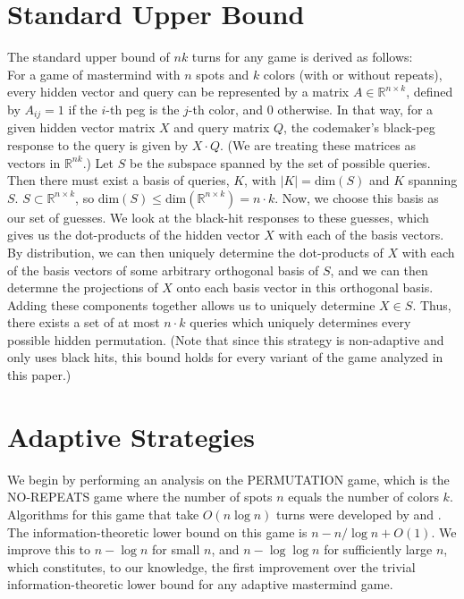 \documentclass[12pt, a4paper]{article}
\begin{document}
\section{Standard Upper Bound}
The standard upper bound of $nk$ turns for any game is derived as follows: \\
For a game of mastermind with $n$ spots and $k$ colors (with or without repeats), every
hidden vector and query can be represented by a matrix $A\in\mathbb{R}^{n\times k}$,
defined by $A_{ij}=1$ if the $i$-th peg is the $j$-th color, and 0 otherwise.
In that way, for a given hidden vector matrix $X$ and query matrix $Q$,
the codemaker's black-peg response to the query is given by $X\cdot Q$.
(We are treating these matrices as vectors in $\mathbb R^{nk}$.)
Let $S$ be the subspace spanned by the set of possible queries. 
Then there must exist a basis of queries,
$K$, with $|K|=\text{dim}(S)$ and $K$ spanning $S$. $S\subset \mathbb{R}^{n\times k}$,
so $\text{dim}(S)\le \text{dim}(\mathbb{R}^{n\times k})=n\cdot k$.
Now, we choose this basis as our set of guesses. We look at the black-hit responses to 
these guesses, which gives us the dot-products of the hidden vector $X$ with each of
the basis vectors. By distribution, we can then uniquely determine the dot-products of 
$X$ with each of the basis vectors of some arbitrary orthogonal basis of $S$, and we can
then determne the projections of $X$ onto each basis vector in this orthogonal basis.
Adding these components together allows us to uniquely determine $X \in S$. 
Thus, there exists a set of at most $n\cdot k$ queries which uniquely determines every
possible hidden permutation. (Note that since this strategy is non-adaptive and only
uses black hits, this bound holds for every variant of the game analyzed in this paper.)
\section{Adaptive Strategies}
We begin by performing an analysis on the PERMUTATION game, which is the NO-REPEATS
game where the number of spots $n$ equals the number of colors $k$. Algorithms for this game
that take $O(n \log n)$ turns were developed by \cite{KT86} and \cite{OS13}. The
information-theoretic lower bound on this game is $n - n/ \log n + O(1)$. We improve this to 
$n - \log n$ for small $n$, and $n- \log \log n$ for sufficiently large $n$, which constitutes, 
to our knowledge, the first improvement over the trivial information-theoretic lower bound
for any adaptive mastermind game. \\
\end{document}
